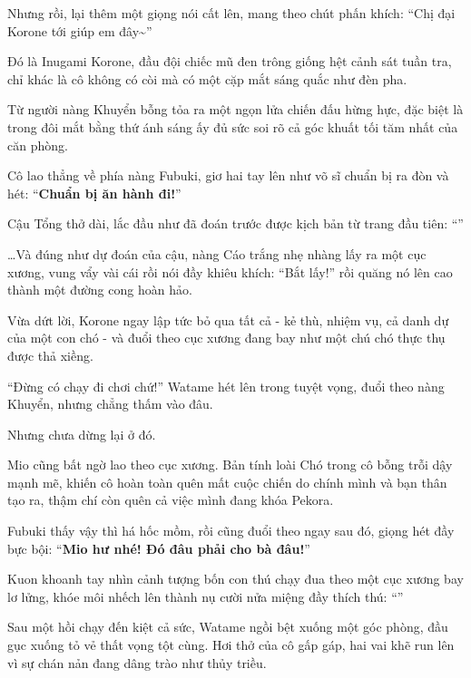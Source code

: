 \documentclass[../main.tex]{subfiles}
\begin{document}

Nhưng rồi, lại thêm một giọng nói cất lên, mang theo chút phấn khích: ``Chị đại Korone tới giúp em đây\~{}''

Đó là Inugami Korone, đầu đội chiếc mũ đen trông giống hệt cảnh sát tuần tra, chỉ khác là cô không có còi mà có một cặp mắt sáng quắc như đèn pha.

Từ người nàng Khuyển bỗng tỏa ra một ngọn lửa chiến đấu hừng hực, đặc biệt là trong đôi mắt bằng thứ ánh sáng ấy đủ sức soi rõ cả góc khuất tối tăm nhất của căn phòng.


Cô lao thẳng về phía nàng Fubuki, giơ hai tay lên như võ sĩ chuẩn bị ra đòn và hét: ``\textbf{Chuẩn bị ăn hành đi!}''

Cậu Tổng thở dài, lắc đầu như đã đoán trước được kịch bản từ trang đầu tiên: ``''

\dots Và đúng như dự đoán của cậu, nàng Cáo trắng nhẹ nhàng lấy ra một cục xương, vung vẩy vài cái rồi nói đầy khiêu khích: ``Bắt lấy!'' rồi quăng nó lên cao thành một đường cong hoàn hảo.

Vừa dứt lời, Korone ngay lập tức bỏ qua tất cả - kẻ thù, nhiệm vụ, cả danh dự của một con chó - và đuổi theo cục xương đang bay như một chú chó thực thụ được thả xiềng.

``Đừng có chạy đi chơi chứ!'' Watame hét lên trong tuyệt vọng, đuổi theo nàng Khuyển, nhưng chẳng thấm vào đâu.

Nhưng chưa dừng lại ở đó.

Mio cũng bất ngờ lao theo cục xương. Bản tính loài Chó trong cô bỗng trỗi dậy mạnh mẽ, khiến cô hoàn toàn quên mất cuộc chiến do chính mình và bạn thân tạo ra, thậm chí còn quên cả việc mình đang khóa Pekora.

Fubuki thấy vậy thì há hốc mồm, rồi cũng đuổi theo ngay sau đó, giọng hét đầy bực bội: ``\textbf{Mio hư nhé! Đó đâu phải cho bà đâu!}''


Kuon khoanh tay nhìn cảnh tượng bốn con thú chạy đua theo một cục xương bay lơ lửng, khóe môi nhếch lên thành nụ cười nửa miệng đầy thích thú: ``''

\ct

Sau một hồi chạy đến kiệt cả sức, Watame ngồi bệt xuống một góc phòng, đầu gục xuống tỏ vẻ thất vọng tột cùng. Hơi thở của cô gấp gáp, hai vai khẽ run lên vì sự chán nản đang dâng trào như thủy triều.
\end{document}
